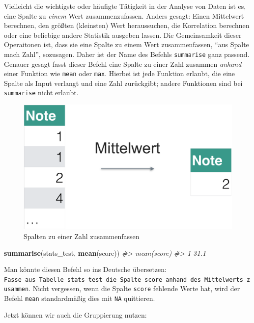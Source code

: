 \documentclass[12pt,]{book}
\newenvironment{Shaded}{\begin{snugshade}}{\end{snugshade}}
\newcommand{\KeywordTok}[1]{\textcolor[rgb]{0.13,0.29,0.53}{\textbf{{#1}}}}
\newcommand{\CommentTok}[1]{\textcolor[rgb]{0.56,0.35,0.01}{\textit{{#1}}}}
\newcommand{\NormalTok}[1]{{#1}}
\begin{document}
Vielleicht die wichtigste oder häufigte Tätigkeit in der Analyse von
Daten ist es, eine Spalte zu \emph{einem} Wert zusammenzufassen. Anders
gesagt: Einen Mittelwert berechnen, den größten (kleinsten) Wert
heraussuchen, die Korrelation berechnen oder eine beliebige andere
Statistik ausgeben lassen. Die Gemeinsamkeit dieser Operaitonen ist,
dass sie eine Spalte zu einem Wert zusammenfassen, ``aus Spalte mach
Zahl'', sozusagen. Daher ist der Name des Befehls \texttt{summarise}
ganz passend. Genauer gesagt fasst dieser Befehl eine Spalte zu einer
Zahl zusammen \emph{anhand} einer Funktion wie \texttt{mean} oder
\texttt{max}. Hierbei ist jede Funktion erlaubt, die eine Spalte als
Input verlangt und eine Zahl zurückgibt; andere Funktionen sind bei
\texttt{summarise} nicht erlaubt.

\begin{figure}

{\centering \includegraphics[width=0.7\linewidth]{images/summarise} 

}

\caption{Spalten zu einer Zahl zusammenfassen}\label{fig:fig-summarise}
\end{figure}

\begin{Shaded}
\begin{Highlighting}[]
\KeywordTok{summarise}\NormalTok{(stats_test, }\KeywordTok{mean}\NormalTok{(score))}
\CommentTok{#>   mean(score)}
\CommentTok{#> 1        31.1}
\end{Highlighting}
\end{Shaded}

Man könnte diesen Befehl so ins Deutsche übersetzen:
\texttt{Fasse\ aus\ Tabelle\ stats\_test\ die\ Spalte\ score\ anhand\ des\ Mittelwerts\ zusammen}.
Nicht vergessen, wenn die Spalte \texttt{score} fehlende Werte hat, wird
der Befehl \texttt{mean} standardmäßig dies mit \texttt{NA} quittieren.

Jetzt können wir auch die Gruppierung nutzen:
\end{document}
